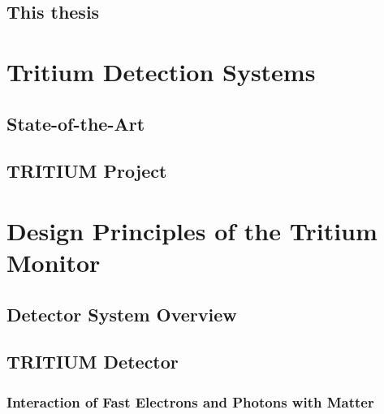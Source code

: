 \documentclass[12pt,a4paper]{book}
\begin{document}
	\section{This thesis}\label{sec:ThisThesis}
	\newpage
	
\chapter{Tritium Detection Systems}\label{chap:TritiumDetection}
	
	\section{State-of-the-Art}\label{sec:StateOfTheArt}
	
	\newpage
	
	\section{TRITIUM Project}\label{sec:TritiumProject}
	
	\newpage
	
		
	
\chapter[TRITIUM Design Principles]{Design Principles of the Tritium Monitor}\label{chap:DesignPrinciples}
	\section{Detector System Overview}\label{sec:MonitorOverview}
	 
	\newpage
	
	\section{TRITIUM Detector}\label{sec:TritiumDectectorIntro}
	 
	\newpage
	
		\subsection[Interaction of Particles with Matter]{Interaction of Fast Electrons and Photons with Matter}\label{subsec:Interaction}
		 
					
\end{document}
